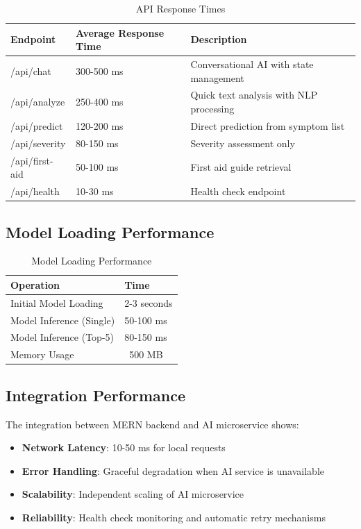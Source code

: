 \documentclass[12pt,a4paper]{article}
\begin{document}
\begin{table}[H]
\centering
\caption{API Response Times}
\label{tab:apiresponse}
\begin{tabularx}{\textwidth}{|l|X|X|}
\hline
\textbf{Endpoint} & \textbf{Average Response Time} & \textbf{Description} \\
\hline
/api/chat & 300-500 ms & Conversational AI with state management \\
\hline
/api/analyze & 250-400 ms & Quick text analysis with NLP processing \\
\hline
/api/predict & 120-200 ms & Direct prediction from symptom list \\
\hline
/api/severity & 80-150 ms & Severity assessment only \\
\hline
/api/first-aid & 50-100 ms & First aid guide retrieval \\
\hline
/api/health & 10-30 ms & Health check endpoint \\
\hline
\end{tabularx}
\end{table}

\subsection{Model Loading Performance}
\begin{table}[H]
\centering
\caption{Model Loading Performance}
\label{tab:modelloading}
\begin{tabularx}{0.7\textwidth}{|l|X|}
\hline
\textbf{Operation} & \textbf{Time} \\
\hline
Initial Model Loading & 2-3 seconds \\
\hline
Model Inference (Single) & 50-100 ms \\
\hline
Model Inference (Top-5) & 80-150 ms \\
\hline
Memory Usage & ~500 MB \\
\hline
\end{tabularx}
\end{table}

\subsection{Integration Performance}
The integration between MERN backend and AI microservice shows:

\begin{itemize}
    \item \textbf{Network Latency}: 10-50 ms for local requests
    \item \textbf{Error Handling}: Graceful degradation when AI service is unavailable
    \item \textbf{Scalability}: Independent scaling of AI microservice
    \item \textbf{Reliability}: Health check monitoring and automatic retry mechanisms
\end{itemize}
\end{document}
